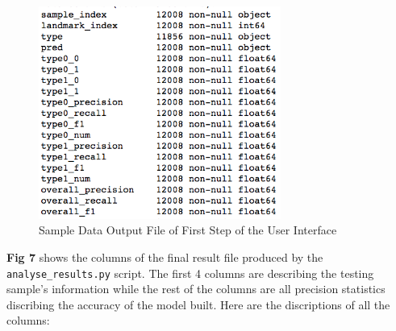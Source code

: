 \documentclass[10pt,letterpaper]{article}
\begin{document}
\begin{figure}[h]

{\centering \includegraphics[width=300px]{figures/Figure5} 

}

\caption{Sample Data Output File of First Step of the User Interface}\label{fig:outputdata2}
\end{figure}

\textbf{Fig 7} shows the columns of the final result file produced by
the \texttt{analyse\_results.py} script. The first 4 columns are
describing the testing sample's information while the rest of the
columns are all precision statistics discribing the accuracy of the
model built. Here are the discriptions of all the columns:
\end{document}
